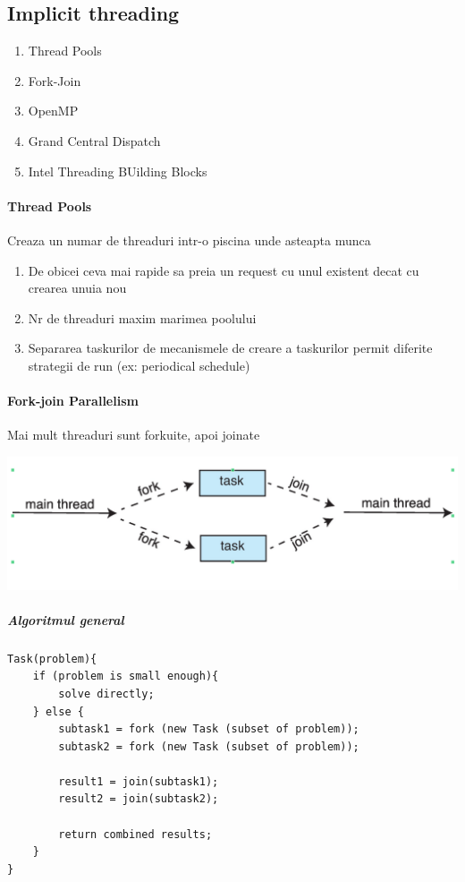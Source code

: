 \documentclass{article}
\begin{document}
\subsection*{Implicit threading}
\begin{enumerate}
    \item Thread Pools
    \item Fork-Join
    \item OpenMP
    \item Grand Central Dispatch
    \item Intel Threading BUilding Blocks
\end{enumerate}

\paragraph*{Thread Pools} Creaza un numar de threaduri intr-o piscina unde asteapta munca
\begin{enumerate}
    \item De obicei ceva mai rapide sa preia un request cu unul existent decat cu crearea unuia nou
    \item Nr de threaduri maxim marimea poolului
    \item Separarea taskurilor de mecanismele de creare a taskurilor permit diferite strategii de run (ex: periodical schedule)
\end{enumerate}

\paragraph*{Fork-join Parallelism} Mai mult threaduri sunt forkuite, apoi joinate

\begin{center}
    \includegraphics[scale=0.3]{9_forkjoin.png}
\end{center}

\subparagraph*{Algoritmul general}
\begin{center}
    \begin{lstlisting}
Task(problem){
    if (problem is small enough){
        solve directly;
    } else {
        subtask1 = fork (new Task (subset of problem));
        subtask2 = fork (new Task (subset of problem));

        result1 = join(subtask1);
        result2 = join(subtask2);

        return combined results;
    }
}
    \end{lstlisting}
\end{center}
\end{document}
